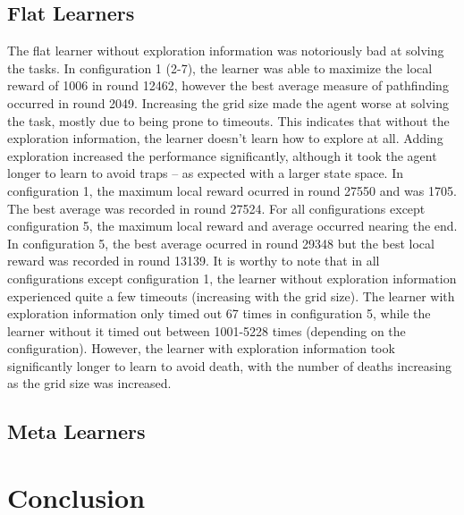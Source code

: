 \documentclass{article}
\begin{document}
	\subsection{Flat Learners}
	\label{s:res:flat}
	The flat learner without exploration information was notoriously bad at solving the tasks. In configuration 1 (2-7), the learner was able to maximize the local reward of 1006 in round 12462, however the best average measure of pathfinding occurred in round 2049. Increasing the grid size made the agent worse at solving the task, mostly due to being prone to timeouts. This indicates that without the exploration information, the learner doesn't learn how to explore at all. 
	Adding exploration increased the performance significantly, although it took the agent longer to learn to avoid traps -- as expected with a larger state space. In configuration 1, the maximum local reward ocurred in round 27550 and was 1705. The best average was recorded in round 27524. For all configurations except configuration 5, the maximum local reward and average occurred nearing the end. In configuration 5, the best average ocurred in round 29348 but the best local reward was recorded in round 13139.
	It is worthy to note that in all configurations except configuration 1, the learner without exploration information experienced quite a few timeouts (increasing with the grid size). The learner with exploration information only timed out 67 times in configuration 5, while the learner without it timed out between 1001-5228 times (depending on the configuration). However, the learner with exploration information took significantly longer to learn to avoid death, with the number of deaths increasing as the grid size was increased.

	\subsection{Meta Learners}
	\label{s:res:meta}


	\section{Conclusion}


\newpage


\newpage
\begin{appendices}


\end{appendices}
\end{document}
